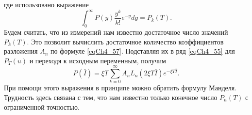 где использовано выражение  
\[
\int_0^{\infty}P\left(y\right)\frac{y^k}{k!}e^{-y}dy =
P_k\left(T\right). 
\]
Будем считать, что из измерений нам
известно достаточное число значений $P_k\left(T\right)$. Это позволит
вычислить достаточное количество коэффициентов разложения $A_n$ по
формуле \eqref{eqCh4_57}. Подставляя их в ряд \eqref{eqCh4_55} для
$P_T\left(u\right)$ и переходя к исходным переменным, получим
\begin{equation}
P\left(\bar{I}\right) = \xi T\sum_{k = 0}^{\infty}
A_n L_n\left(2 \xi T \bar{I}\right)e^{- \xi T \bar{I}}.
\label{eqCh4_58}
\end{equation}
При помощи этого выражения в принципе можно обратить формулу
Манделя. Трудность здесь связана с тем, что нам известно только
конечное число $P_n\left(T\right)$ с ограниченной точностью. 

